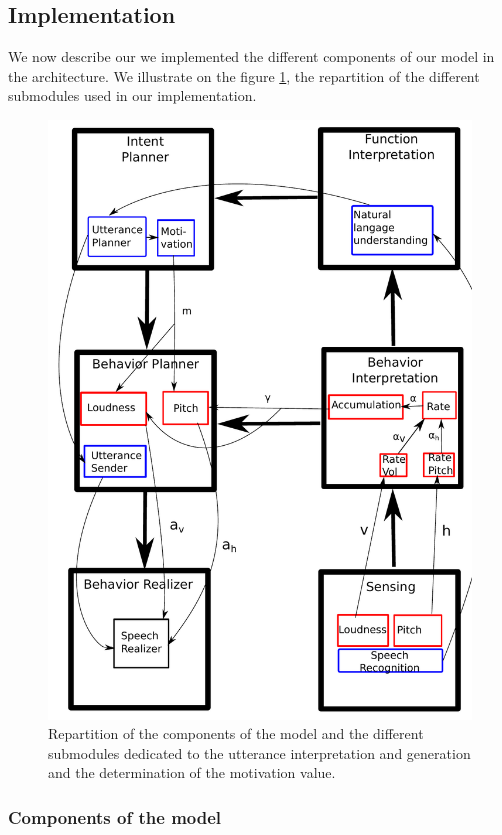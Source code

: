 \subsection{Implementation}

We now describe our we implemented the different components of our model in the architecture. We illustrate on the figure \ref{impl_modules}, the repartition of the different submodules used in our implementation. 

\begin{figure}
\centering
\includegraphics[width=\linewidth]{figure/impl_equ_dial.pdf}
\caption{Repartition of the components of the model and the different submodules dedicated to the utterance interpretation and generation and the determination of the motivation value.}
\label{impl_modules}
\end{figure}
 

\subsubsection{Components of the model}

